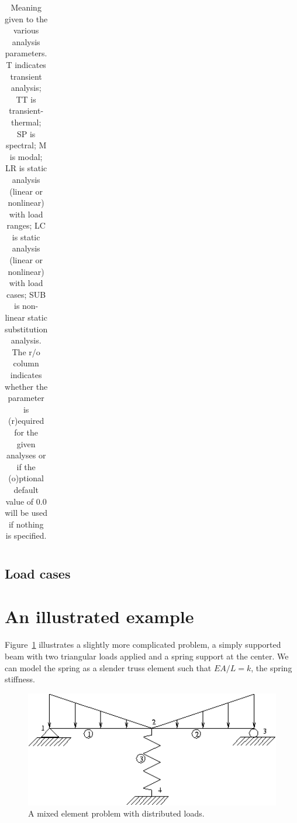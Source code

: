 \begin{table}
\begin{center}
{\begin{tabular}{|c|l|l|c|c|}
\hline
   \end{tabular}
}
  \end{center}
\caption[Meaning given to the various analysis parameters.]
        {Meaning given to the various analysis parameters.  T indicates 
         transient analysis; TT is transient-thermal; SP is spectral; 
         M is modal; LR is static analysis (linear or nonlinear) 
         with load ranges; LC is 
         static analysis (linear or nonlinear) with load cases; 
         SUB is non-linear static
         substitution analysis.  The r/o column indicates whether the 
         parameter is (r)equired for the given analyses or if the 
         (o)ptional default value of 0.0 will be used if nothing is specified.}
\label{analysis_table}
\end{table}

\subsection{Load cases}


\section{An illustrated example}
\label{problem.example}

Figure~\ref{problem.example1} illustrates a slightly more complicated 
problem,  a 
simply supported beam with two triangular loads applied and a spring support 
at the center.  We can model the spring as a slender truss element such that
$EA/L = k$, the spring stiffness.  

\begin{figure}[htb]
 \begin{center}
  \includegraphics[width=5.5in]{figures/example1}
 \end{center}
 \caption{A mixed element problem with distributed loads.}
 \label{problem.example1}
\end{figure}

